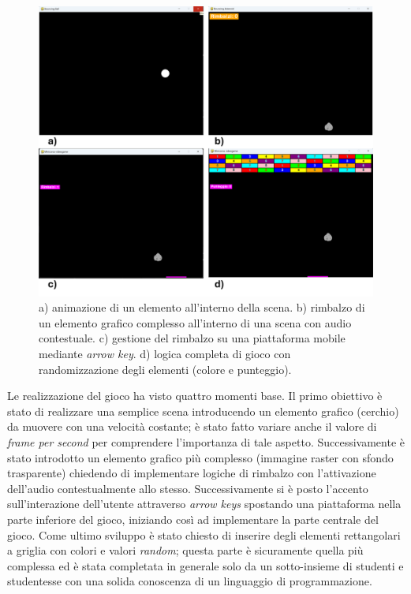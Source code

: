 \documentclass{easychair}
\begin{document}
\begin{figure}[ht]
    \centering
    \includegraphics[width=1.0\textwidth]{game.png}
    \caption{a) animazione di un elemento all'interno della scena. b) rimbalzo di un elemento grafico complesso all'interno di una scena con audio contestuale. c) gestione del rimbalzo su una piattaforma mobile mediante \textit{arrow key}. d) logica completa di gioco con randomizzazione degli elementi (colore e punteggio).}
    \label{fig:game}
\end{figure}
Le realizzazione del gioco ha visto quattro momenti base. Il primo obiettivo è stato di realizzare una semplice scena introducendo un elemento grafico (cerchio) da muovere con una velocità costante; è stato fatto variare anche il valore di \textit{frame per second} per comprendere l'importanza di tale aspetto. Successivamente è stato introdotto un elemento grafico più complesso (immagine raster con sfondo trasparente) chiedendo di implementare logiche di rimbalzo con l'attivazione dell'audio contestualmente allo stesso. Successivamente si è posto l'accento sull'interazione dell'utente attraverso \textit{arrow keys} spostando una piattaforma nella parte inferiore del gioco, iniziando così ad implementare la parte centrale del gioco. Come ultimo sviluppo è stato chiesto di inserire degli elementi rettangolari a griglia con colori e valori \textit{random}; questa parte è sicuramente quella più complessa ed è stata completata in generale solo da un sotto-insieme di studenti e studentesse con una solida conoscenza di un linguaggio di programmazione.
\end{document}
